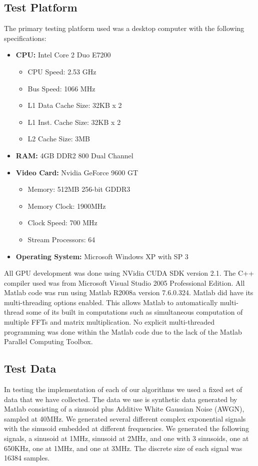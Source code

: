 \subsection{Test Platform}
\label{sect:test_platform}
The primary testing platform used was a desktop computer with the following specifications:
\begin{itemize}
\item \textbf{CPU:} Intel Core 2 Duo E7200
	\begin{itemize}
	\item CPU Speed: 2.53 GHz
	\item Bus Speed: 1066 MHz
	\item L1 Data Cache Size: 32KB x 2
	\item L1 Inst. Cache Size: 32KB x 2
	\item L2 Cache Size: 3MB
	\end{itemize}
\item \textbf{RAM:} 4GB DDR2 800 Dual Channel
\item \textbf{Video Card:} Nvidia GeForce 9600 GT
	\begin{itemize}
	\item Memory: 512MB 256-bit GDDR3
	\item Memory Clock: 1900MHz
	\item Clock Speed: 700 MHz
	\item Stream Processors: 64
	\end{itemize}
\item \textbf{Operating System:} Microsoft Windows XP with SP 3
\end{itemize}

All GPU development was done using NVidia CUDA SDK version 2.1.  The C++ compiler used was from Microsoft Visual Studio 2005 Professional Edition.  All Matlab code was run using Matlab R2008a version 7.6.0.324.  Matlab did have its multi-threading options enabled.  This allows Matlab to automatically multi-thread some of its built in computations such as simultaneous computation of multiple FFTs and matrix multiplication.  No explicit multi-threaded programming was done within the Matlab code due to the lack of the Matlab Parallel Computing Toolbox.

\subsection{Test Data}
In testing the implementation of each of our algorithms we used a fixed set of data that we have collected.  The data we use is synthetic data generated by Matlab consisting of a sinusoid plus Additive White Gaussian Noise (AWGN), sampled at 40MHz.  We generated several different complex exponential signals with the sinusoid embedded at different frequencies.  We generated the following signals, a sinusoid at 1MHz, sinusoid at 2MHz, and one with 3 sinusoids, one at 650KHz, one at 1MHz, and one at 3MHz.  The discrete size of each signal was 16384 samples.

